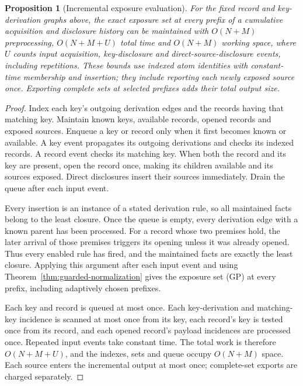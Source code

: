 \documentclass[pdflatex]{sn-jnl}
\theoremstyle{thmstyleone}
\newtheorem{proposition}[theorem]{Proposition}
\theoremstyle{thmstylethree}
\theoremstyle{thmstyletwo}
\begin{document}
\begin{proposition}[Incremental exposure evaluation]
\label{prop:guarded-worklist}
For the fixed record and key-derivation graphs above, the exact exposure
set at every prefix of a cumulative acquisition and disclosure history
can be maintained with $O(N+M)$ preprocessing, $O(N+M+U)$ total time and
$O(N+M)$ working space, where $U$ counts input acquisition, key-disclosure
and direct-source-disclosure events, including repetitions. These bounds
use indexed atom identities with constant-time membership and insertion;
they include reporting each newly exposed source once. Exporting complete
sets at selected prefixes adds their total output size.
\end{proposition}
\begin{proof}
Index each key's outgoing derivation edges and the records having that
matching key. Maintain known keys, available records, opened records and
exposed sources. Enqueue a key or record only when it first becomes known
or available. A key event propagates its outgoing derivations and checks
its indexed records. A record event checks its matching key. When both
the record and its key are present, open the record once, making its
children available and its sources exposed. Direct disclosures insert
their sources immediately. Drain the queue after each input event.

Every insertion is an instance of a stated derivation rule, so all
maintained facts belong to the least closure. Once the queue is empty, every
derivation edge with a known parent has been processed. For a record
whose two premises hold, the later arrival of those premises triggers
its opening unless it was already opened. Thus every enabled rule has
fired, and the maintained facts are exactly the least closure. Applying
this argument after each input event and using
Theorem~\ref{thm:guarded-normalization} gives the exposure set (GP) at
every prefix, including adaptively chosen prefixes.

Each key and record is queued at most once. Each key-derivation and
matching-key incidence is scanned at most once from its key, each
record's key is tested once from its record, and each opened record's
payload incidences are processed once. Repeated input events take
constant time. The total work is therefore $O(N+M+U)$, and the indexes,
sets and queue occupy $O(N+M)$ space. Each source enters the incremental
output at most once; complete-set exports are charged separately.
\end{proof}
\end{document}
